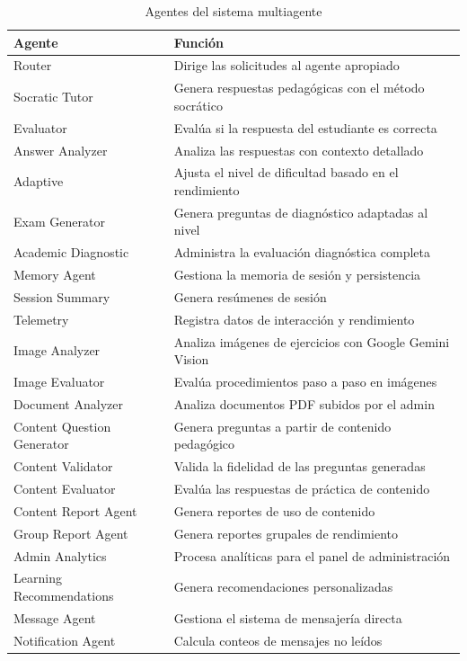 \documentclass[12pt, a4paper, oneside]{book}
\begin{document}
\begin{table}[H]
\centering
\renewcommand{\arraystretch}{1.3}
\begin{tabularx}{\textwidth}{l X}
    \toprule
    \textbf{Agente} & \textbf{Función} \\
    \midrule
    Router & Dirige las solicitudes al agente apropiado \\
    Socratic Tutor & Genera respuestas pedagógicas con el método socrático \\
    Evaluator & Evalúa si la respuesta del estudiante es correcta \\
    Answer Analyzer & Analiza las respuestas con contexto detallado \\
    Adaptive & Ajusta el nivel de dificultad basado en el rendimiento \\
    Exam Generator & Genera preguntas de diagnóstico adaptadas al nivel \\
    Academic Diagnostic & Administra la evaluación diagnóstica completa \\
    Memory Agent & Gestiona la memoria de sesión y persistencia \\
    Session Summary & Genera resúmenes de sesión \\
    Telemetry & Registra datos de interacción y rendimiento \\
    Image Analyzer & Analiza imágenes de ejercicios con Google Gemini Vision \\
    Image Evaluator & Evalúa procedimientos paso a paso en imágenes \\
    Document Analyzer & Analiza documentos PDF subidos por el admin \\
    Content Question Generator & Genera preguntas a partir de contenido pedagógico \\
    Content Validator & Valida la fidelidad de las preguntas generadas \\
    Content Evaluator & Evalúa las respuestas de práctica de contenido \\
    Content Report Agent & Genera reportes de uso de contenido \\
    Group Report Agent & Genera reportes grupales de rendimiento \\
    Admin Analytics & Procesa analíticas para el panel de administración \\
    Learning Recommendations & Genera recomendaciones personalizadas \\
    Message Agent & Gestiona el sistema de mensajería directa \\
    Notification Agent & Calcula conteos de mensajes no leídos \\
    \bottomrule
\end{tabularx}
\caption{Agentes del sistema multiagente}
\end{table}
\end{document}
